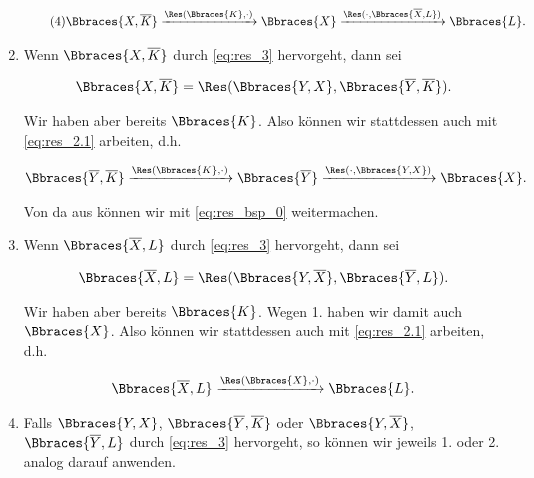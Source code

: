 \begin{solution}
\begin{enumerate}[label = (\arabic*), start = 0]
    \begin{align} \label{eq:res_bsp_0} \tag{4}
        \Bbraces{X, \overline K}
        \xrightarrow{\Res(\Bbraces{K}, \cdot)}
        \Bbraces{X}
        \xrightarrow{\Res(\cdot, \Bbraces{\overline X, L})}
        \Bbraces{L}.
    \end{align}

    \item Wenn $\Bbraces{X, \overline K}$ durch \eqref{eq:res_3} hervorgeht, dann sei

    \begin{align*}
        \Bbraces{X, \overline K}
        =
        \Res(\Bbraces{Y, X}, \Bbraces{\overline Y, \overline K}).        
    \end{align*}

    Wir haben aber bereits $\Bbraces{K}$.
    Also können wir stattdessen auch mit \eqref{eq:res_2.1} arbeiten, d.h.

    \begin{align*}
        \Bbraces{\overline Y, \overline K}
        \xrightarrow{\Res(\Bbraces{K}, \cdot)}
        \Bbraces{\overline Y}
        \xrightarrow{\Res(\cdot, \Bbraces{Y, X})}
        \Bbraces{X}.
    \end{align*}

    Von da aus können wir mit \eqref{eq:res_bsp_0} weitermachen.

    \item Wenn $\Bbraces{\overline X, L}$ durch \eqref{eq:res_3} hervorgeht, dann sei
    
    \begin{align*}
        \Bbraces{\overline X, L}
        =
        \Res(\Bbraces{Y, \overline X}, \Bbraces{\overline Y, L}).
    \end{align*}

    Wir haben aber bereits $\Bbraces{K}$.
    Wegen 1. haben wir damit auch $\Bbraces{X}$.
    Also können wir stattdessen auch mit \eqref{eq:res_2.1} arbeiten, d.h.

    \begin{align*}
        \Bbraces{\overline X, L}
        \xrightarrow{\Res(\Bbraces{X}, \cdot)}
        \Bbraces{L}.
    \end{align*}

    \item Falls $\Bbraces{Y, X}$, $\Bbraces{\overline Y, \overline K}$ oder $\Bbraces{Y, \overline X}$, $\Bbraces{\overline Y, L}$ durch \eqref{eq:res_3} hervorgeht, so können wir jeweils 1. oder 2. analog darauf anwenden.


\end{enumerate}
\end{solution}
